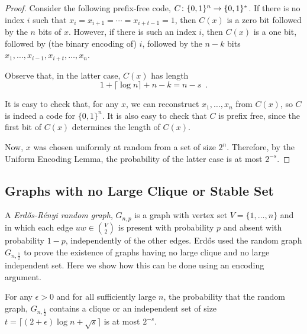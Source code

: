 \documentclass[lotsofwhite]{patmorin}
\begin{document}
\begin{proof}
  Consider the following prefix-free code, $C\colon\{0,1\}^n\to\{0,1\}^*$.
  If there is no index $i$ such that $x_i=x_{i+1}=\cdots=x_{i+t-1}=1$,
  then $C(x)$ is a zero bit followed by the $n$ bits of $x$.
  However, if there is such an index $i$, then $C(x)$ is a one bit,
  followed by (the binary encoding of) $i$, followed by the $n-k$ bits
  $x_1,\ldots,x_{i-1},x_{i+t},\ldots,x_n$.

  Observe that, in the latter case, $C(x)$ has length 
  \[
      1 + \lceil\log n\rceil + n - k = n-s \enspace .
  \]

  It is easy to check that, for any $x$, we can reconstruct
  $x_1,\ldots,x_n$ from $C(x)$, so $C$ is indeed a code for $\{0,1\}^n$.
  It is also easy to check that $C$ is prefix free, since the first bit
  of $C(x)$ determines the length of $C(x)$.

  Now, $x$ was chosen uniformly at random from a set of size $2^{n}$.
  Therefore, by the Uniform Encoding Lemma, the probability of the latter
  case is at most $2^{-s}$.
\end{proof}

\subsection{Graphs with no Large Clique or Stable Set}


A \emph{Erd\H{o}s-R\'enyi random graph}, $G_{n,p}$ is a graph with vertex
set $V=\{1,\ldots,n\}$ and in which each edge $uw\in \binom{V}{2}$
is present with probability $p$ and absent with probability $1-p$,
independently of the other edges.  Erd\H{o}s \cite{X} used the random
graph $G_{n,\frac{1}{2}}$ to prove the existence of graphs having no
large clique and no large independent set. Here we show how this can be
done using an encoding argument.

\begin{thm}
For any $\epsilon>0$ and for all sufficiently large $n$, the probability
that the random graph, $G_{n,\frac{1}{2}}$ contains a clique or an
independent set of size $t = \lceil(2+\epsilon)\log n + \sqrt{s}\rceil$
is at most $2^{-s}$.
\end{thm}
\end{document}

